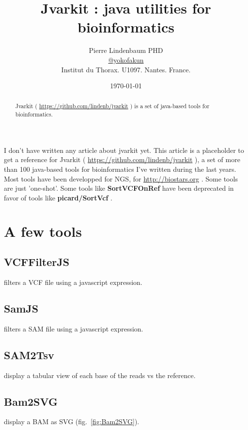 \documentclass{article}
\begin{document}
\date{\today}
\title{Jvarkit : java utilities for bioinformatics}
\author{Pierre Lindenbaum PHD\\\href{http://twitter.com/yokofakun}{@yokofakun}\\Institut du Thorax. U1097. Nantes. France.}

\maketitle

\begin{abstract}
Jvarkit ( \url{https://github.com/lindenb/jvarkit} ) is a set of java-based tools for bioinformatics.
\end{abstract}

I don't have written any article about jvarkit yet. This article is a placeholder to get a reference for
Jvarkit ( \url{https://github.com/lindenb/jvarkit} ), a set of more than 100 java-based tools for bioinformatics I've written during the
last years. Most tools have been developped for NGS, for \url{http://biostars.org} \cite{biostar}. Some tools are just 'one-shot'. Some tools like \textbf{SortVCFOnRef} have been deprecated in favor of tools like \textbf{picard/SortVcf} \cite{sortvcf}.


\section{A few tools}

\subsection{VCFFilterJS}
filters a VCF file using a javascript expression.

\subsection{SamJS}
filters a SAM file using a javascript expression.

\subsection{SAM2Tsv}
display a tabular view of each base of the reads vs the reference.

\subsection{Bam2SVG}
display a BAM as SVG (fig.~\ref{fig:Bam2SVG}).
\end{document}
